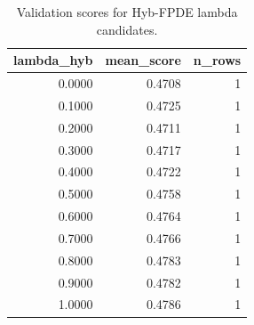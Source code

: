 \begin{table}[t]
\caption{Validation scores for Hyb-FPDE lambda candidates.}
\label{tab:lambda_distribution_computed}
\centering
\begin{tabular}{rrr}
\toprule
lambda\_hyb & mean\_score & n\_rows \\
\midrule
0.0000 & 0.4708 & 1 \\
0.1000 & 0.4725 & 1 \\
0.2000 & 0.4711 & 1 \\
0.3000 & 0.4717 & 1 \\
0.4000 & 0.4722 & 1 \\
0.5000 & 0.4758 & 1 \\
0.6000 & 0.4764 & 1 \\
0.7000 & 0.4766 & 1 \\
0.8000 & 0.4783 & 1 \\
0.9000 & 0.4782 & 1 \\
1.0000 & 0.4786 & 1 \\
\bottomrule
\end{tabular}

\end{table}
